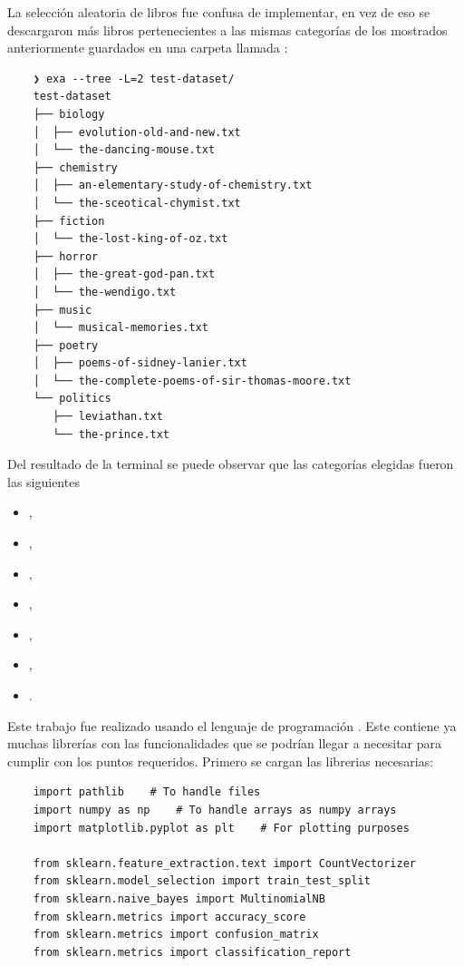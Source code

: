 La selección aleatoria de libros fue confusa de implementar, en vez de eso se descargaron más libros pertenecientes a las mismas categorías de los mostrados anteriormente guardados en una carpeta llamada :
\begin{verbatim}
    ❯ exa --tree -L=2 test-dataset/
    test-dataset
    ├── biology
    │  ├── evolution-old-and-new.txt
    │  └── the-dancing-mouse.txt
    ├── chemistry
    │  ├── an-elementary-study-of-chemistry.txt
    │  └── the-sceotical-chymist.txt
    ├── fiction
    │  └── the-lost-king-of-oz.txt
    ├── horror
    │  ├── the-great-god-pan.txt
    │  └── the-wendigo.txt
    ├── music
    │  └── musical-memories.txt
    ├── poetry
    │  ├── poems-of-sidney-lanier.txt
    │  └── the-complete-poems-of-sir-thomas-moore.txt
    └── politics
       ├── leviathan.txt
       └── the-prince.txt
\end{verbatim}

Del resultado de la terminal se puede observar que las categorías elegidas fueron las siguientes
\begin{itemize}
    \item {},
    \item {},
    \item {},
    \item {},
    \item {},
    \item {},
    \item {}.
\end{itemize}

Este trabajo fue realizado usando el lenguaje de programación . Este contiene ya muchas librerías con las funcionalidades que se podrían llegar a necesitar para cumplir con los puntos requeridos. Primero se cargan las librerias necesarias:
\begin{verbatim}
    import pathlib    # To handle files
    import numpy as np    # To handle arrays as numpy arrays
    import matplotlib.pyplot as plt    # For plotting purposes

    from sklearn.feature_extraction.text import CountVectorizer
    from sklearn.model_selection import train_test_split
    from sklearn.naive_bayes import MultinomialNB
    from sklearn.metrics import accuracy_score
    from sklearn.metrics import confusion_matrix
    from sklearn.metrics import classification_report
\end{verbatim}

